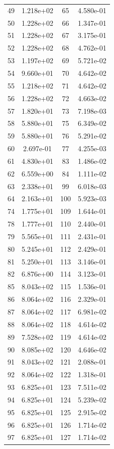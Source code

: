 \documentclass[12pt]{article}
\begin{document}
\begin{longtable}{@{}cccc@{}}
49 & 1.218e+02 & 65 & 4.580e-01 \\
50 & 1.228e+02 & 66 & 1.347e-01 \\
51 & 1.228e+02 & 67 & 3.175e-01 \\
52 & 1.228e+02 & 68 & 4.762e-01 \\
53 & 1.197e+02 & 69 & 5.721e-02 \\
54 & 9.660e+01 & 70 & 4.642e-02 \\
55 & 1.218e+02 & 71 & 4.642e-02 \\
56 & 1.228e+02 & 72 & 4.663e-02 \\
57 & 1.820e+01 & 73 & 7.198e-03 \\
58 & 5.880e+01 & 75 & 6.349e-02 \\
59 & 5.880e+01 & 76 & 5.291e-02 \\
60 & 2.697e-01 & 77 & 4.255e-03 \\
61 & 4.830e+01 & 83 & 1.486e-02 \\
62 & 6.559e+00 & 84 & 1.111e-02 \\
63 & 2.338e+01 & 99 & 6.018e-03 \\
64 & 2.163e+01 & 100 & 5.923e-03 \\
74 & 1.775e+01 & 109 & 1.644e-01 \\
78 & 1.777e+01 & 110 & 2.440e-01 \\
79 & 5.565e+01 & 111 & 2.431e-01 \\
80 & 5.245e+01 & 112 & 2.429e-01 \\
81 & 5.250e+01 & 113 & 3.146e-01 \\
82 & 6.876e+00 & 114 & 3.123e-01 \\
85 & 8.043e+02 & 115 & 1.536e-01 \\
86 & 8.064e+02 & 116 & 2.329e-01 \\
87 & 8.064e+02 & 117 & 6.981e-02 \\
88 & 8.064e+02 & 118 & 4.614e-02 \\
89 & 7.528e+02 & 119 & 4.614e-02 \\
90 & 8.085e+02 & 120 & 4.646e-02 \\
91 & 8.043e+02 & 121 & 2.088e-01 \\
92 & 8.064e+02 & 122 & 1.318e-01 \\
93 & 6.825e+01 & 123 & 7.511e-02 \\
94 & 6.825e+01 & 124 & 5.239e-02 \\
95 & 6.825e+01 & 125 & 2.915e-02 \\
96 & 6.825e+01 & 126 & 1.714e-02 \\
97 & 6.825e+01 & 127 & 1.714e-02 \\

\end{longtable}
\end{document}
